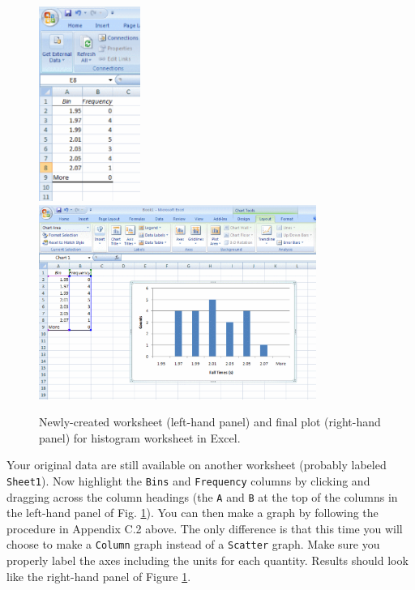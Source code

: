 \begin{figure}[b!]
\begin{center}
\includegraphics[height=2.5in]{appendices/excelfigs/histf3.eps}\hspace{0.4in}\includegraphics[height=2.5in]{appendices/excelfigs/histf4.eps}
\caption{Newly-created worksheet (left-hand panel) and final plot (right-hand panel) for  histogram worksheet in Excel.}\label{hist5}
\end{center}
\end{figure}
Your original data are still available on another worksheet (probably labeled {\tt Sheet1}).
Now highlight the {\tt Bins} and {\tt Frequency} columns by clicking and dragging across the column headings (the {\tt A} and {\tt B}
at the top of the columns in the left-hand panel of Fig. \ref{hist5}).
You can then make a graph by following the procedure in Appendix C.2 above.
The only difference is that this time you will choose to make a {\tt Column}
graph instead of a {\tt Scatter} graph.
Make sure you properly label the axes including the units for each quantity.
Results should look like the right-hand panel of Figure \ref{hist5}.
